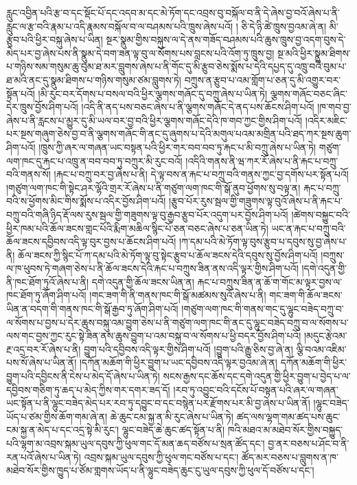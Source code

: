 རླུང་འབྱིན་པའི་རྩ་བ་དང་སྡོང་པོ་དང་འདབ་མ་དང་མེ་ཏོག་དང་འབྲས་བུ་བསྐོལ་བ་ནི་དེ་ཞེས་བྱ་བའོ་ཞེས་པ་ནི་རླུང་ལ་རྩ་བའི་རྣམ་པ་འདི་རྣམས་བསྐོལ་བ་ལ་བཤམས་པའི་ཁྲུས་ཞེས་པའོ། །
ཅི་དེ་ཉི་ཚེ་ཁྲུས་བྱའམ་ཞེ་ན། མི་རྩུབ་པའི་ཕྱིར་བསྐུ་ཞེས་པ་ཡིན། སྔར་སྣུམ་གྱིས་བསྐུས་ལ་དེ་ནས་གཟོད་བཤམས་པའི་ཆུས་ཁྲུས་བྱ་འདག་བུས་དེ་མེད་པར་བྱ་ཞེས་པས་ནི་སྣུམ་དེ་བག་ཟན་ལྟ་བུ་ལ་སོགས་པས་བླངས་པའི་འོག་ཏུ་ཁྲུས་བྱ། སྔ་མའི་ཕྱིར་སྣུམ་ཐིགས་པ་གཉིས་སམ་གསུམ་ཆུ་བུམ་ཐ་མར་བླུགས་ཞེས་པ་ནི་གོང་དུ་མི་རྩུབ་ཅེས་སྨོས་པ་དེའི་དཔྱད་དུ་འཁྲུ་བའི་བུམ་པ་ཐ་མའི་ནང་དུ་སྣུམ་ཐིགས་པ་གཉིས་གསུམ་ཙམ་བླུགས་ཏེ། བཀྲུས་ན་རྩུབ་པ་འམ་གློག་པ་ཅན་དུ་མི་འགྱུར་བར་སྟོན་པའོ། །མི་རུང་བར་དོགས་པ་བསལ་བའི་ཕྱིར་ལྕགས་གཞོང་དུ་བཀྲུ་ཞེས་པ་ཡིན་ཏེ། ལྕགས་གཞོང་བཅང་ཞིང་དེར་ཁྲུས་བྱོས་ཤིག་པའོ། །འདི་ནི་ནད་པས་བཅང་ཞེས་པ་ནི་ལྕགས་གཞོང་དེ་ནད་པས་ཆོངས་ཤིག་པའོ། །ཁ་གབ་བྱ་ཞེས་པ་ནི་རླངས་པ་མྱུར་དུ་མི་ཡལ་བར་བྱ་བའི་ཕྱིར་ལྕགས་གཞོང་དེའི་ཁ་གབ་ཀྱང་གྱིས་ཤིག་པའོ། །འདིར་མཇིང་པར་སྔས་གཞུག་ཅེས་བྱ་བ་ནི་ལྕགས་གཞོང་གི་ནང་དུ་ཞུགས་པ་དེའི་མགུལ་པའམ་མགྲིན་པའི་ཐད་ཀར་སྔས་ཆུག་ཤིག་པའོ། །ཁྲུས་ཀྱི་ཞར་ལ་གཞན་ཡང་བསྟན་པའི་ཕྱིར་གར་བབ་བབ་ཏུ་རྐང་པ་མི་བཀྲུ་ཞེས་པ་ཡིན་ཏེ། གཙུག་ལག་ཁང་དུ་རྐང་པ་འཁྲུ་ན་བབ་བབ་ཏུ་བཀྲུར་མི་རུང་བའོ། །འདིའི་གནས་ནི་ཝ་ཀར་རོ་ཞེས་པ་ནི་རྐང་པ་བཀྲུ་བའི་གནས་སོ། །རྐང་པ་བཀྲུ་བར་བྱ་ཞེས་པ་ནི། དེ་ལྟ་བས་ན་རྐང་པ་བཀྲུ་བའི་གནས་ཀྱང་བྱ་དགོས་པར་སྟོན་པའོ། །གཙུག་ལག་ཁང་གི་སྟེང་ཤར་ལྷོའི་གྲར་རོ་ཞེས་པ་ནི་གཙུག་ལག་ཁང་གི་སྒོ་ནུབ་ཕྱོགས་སུ་བལྟ་ན། རྐང་པ་བཀྲུ་བའི་ས་ཕྱོགས་མིང་གིས་སྨོས་པ་འདིར་བྱོས་ཤིག་པའོ། །རྩུབ་པོར་རུས་སྦལ་གྱི་གཟུགས་ལྟ་བུའོ་ཞེས་པ་ནི་རྐང་པ་བཀྲུ་བའི་གཞི་ཉིད་རྡོ་ལས་རུས་སྦལ་གྱི་གཟུགས་ལྟ་བུ་རྒྱབ་རྩུབ་པོར་འདུག་པར་བྱོས་ཤིག་པའོ། །ཚེགས་བསྐྱུང་བའི་ཕྱིར་ཁམ་པའི་ཆོལ་ཟངས་གླང་པོའི་རྨིག་མཆིལ་སྙིང་པོ་ཅན་བཅང་ཞེས་པ་ཅན་ཡིན་ཏེ། ཡང་ན་རྐང་པ་བཀྲུ་བའི་ཆོལ་ཟངས་དབྱིབས་འདི་ལྟ་བུར་བྱས་པ་ཆོངས་ཤིག་པའོ། །ཀ་དམ་པའི་མེ་ཏོག་ལྟ་བུས་རྩུབ་པ་དབུས་སུ་བྱ་ཞེས་པ་ནི། ཆོལ་ཟངས་ཀྱི་སྙིང་པོ་ཀ་དམ་པའི་མེ་ཏོག་ལྟ་བུ་སྟེང་རྩུབ་པ་ཆོལ་ཟངས་དེའི་དབུས་སུ་བྱོས་ཤིག་པའོ། །བཀྲུས་ལ་ཁ་ཕུབས་ཏེ་གཞག་ཅེས་པ་ནི་ཆོལ་ཟངས་དེའི་རྐང་པ་བཀྲུས་ཟིན་ནས་འདི་ལྟར་གྱིས་ཤིག་པའོ། །དགེ་འདུན་གྱི་ནི་ཁང་ཐོག་ཏུའོ་ཞེས་པ་ནི། དགེ་འདུན་གྱི་ཆོལ་ཟངས་ཡིན་ན། རྐང་པ་བཀྲུས་ཟིན་ན་ཆོ་ག་གོང་མ་ལྟར་བྱས་ལ་ཁང་ཐོག་ཏུ་ཞོག་ཤིག་པའོ། །གང་ཟག་གི་ནི་གནས་ཁང་གི་སྒོ་མཚམས་སུའོ་ཞེས་པ་ནི། གང་ཟག་གི་ཆོལ་ཟངས་ཡིན་ན་བདག་གི་གནས་ཁང་གི་སྒོ་རྒྱབ་ཏུ་ཞོག་ཤིག་པའོ། །གཙུག་ལག་ཁང་གི་གནས་གང་དུ་ལྷུང་བཟེད་བཀྲུ་བ་ལ་སོགས་པ་བྱས་པ་དེར་ཆུས་བསྐུ་འམ་བྱུག་ཅེས་པ་ནི་གཙུག་ལག་ཁང་གི་ནང་དུ་ལྷུང་བཟེད་བཀྲུ་བ་ལ་སོགས་པ་ལས་གང་བྱས་ཀྱང་རུང་སྟེ་ཟིན་ནས་ཆུས་བྱུག་པ་འམ་བསྐུ་བ་ལ་སོགས་པ་ཕྱི་བདར་བྱོས་ཤིག་པའོ། །མདུང་རྩེའམ་རྔ་འདྲ་བར་རོ་ཞེས་པ་ནི། བྱུག་པའི་དབྱིབས་འདི་ལྟར་གྱིས་ཤིག་པའོ། །བྱུག་པའི་རྒྱུ་ཅིས་བྱ་ཞེ་ན། ལྕི་བའམ་འཇིམ་པས་སོ་ཞེས་པ་ཡིན་ནོ། །དཀོན་མཆོག་གི་ཕྱིར་བྱུག་པ་ཡང་དབྱིབས་འདི་ལྟར་བྱའམ་ཞེ་ན། དཀོན་མཆོག་གི་ཕྱིར་བྱུག་པའི་དབྱིངས་ནི་ངེས་པ་མེད་དོ་ཞེས་པ་ཡིན་ཏེ། སངས་རྒྱས་དང་ཆོས་དང་དགེ་འདུན་གྱི་ཕྱིར་བྱུག་པ་བྱེད་པ་ལ་དབྱིབས་གཅིག་ཏུ་ཆད་པ་མེད་ཀྱིས་གར་དགར་ཟད་དོ། །རབ་ཏུ་འབྱུང་བའི་དངོས་པོ་བསྟན་པའི་ཞར་ལ་གཞན་ཡང་སྟོན་པ་ནི་ལྷུང་བཟེད་མེད་པར་རབ་ཏུ་དབྱུང་བ་དང་བསྙེན་པར་རྫོགས་པར་མི་བྱ་ཞེས་པ་ཡིན་ནོ། །ལྷུང་བཟེད་ཡོད་པ་ཙམ་གྱིས་ཆོག་གམ་ཞེ་ན། ཆེ་ཆུང་ངམ་སྐྱ་ན་མི་རུང་ཞེས་པ་ཡིན་ཏེ། ཚད་ལས་ལྷག་གམ་ཚད་པས་ཆུང་ངམ་སྐྱ་ན་མེད་པ་དང་འདྲ་སྟེ་མི་རུང་། ལྷུང་བཟེད་ཆེ་ཆུང་ཚད་སྟོན་པ་ནི། ཁའི་མཐའ་མ་མཐེབ་སོར་གྱིས་བསྐྱུད་པའི་ལྷག་མ་འབྲས་སྐམ་ཡུལ་དབུས་ཀྱི་ཕུལ་གང་དོ་མན་ཆད་བཙོས་པ་སྲན་ཚོད་དང་། བྱ་ནར་བཅས་པ་ཤོང་བ་ནི་རན་པའོ་ཞེས་པ་ཡིན་ཏེ། འབྲས་སྐམ་ཡུལ་དབུས་ཀྱི་ཕུལ་གང་བཙོས་པ་དང་། ཚོད་མར་བཅས་པ་བླུགས་ན་ཁ་མཐེབ་སོར་གྱིས་ཁྱུད་པ་ཙོམ་གླགས་ཡོད་པ་ནི་ལྷུང་བཟེད་ཆུང་ངུ་ཡུལ་དབུས་ཀྱི་ཕུལ་དོ་བཙོས་པ་དང་། 